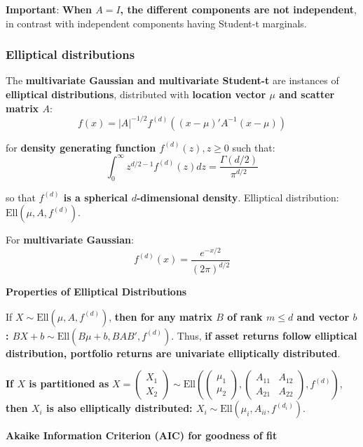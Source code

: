\documentclass[12pt,a4paper]{article}
\begin{document}
\textbf{Important}: \textbf{When $A = I$, the different components are not independent}, in contrast with independent components having Student-t marginals.

\subsubsection{Elliptical distributions}

The \textbf{multivariate Gaussian and multivariate Student-t} are instances of \textbf{elliptical distributions}, distributed with \textbf{location vector $\mu$ and scatter matrix $A$}:
\[
f(x) = |A|^{-1/2} f^{(d)}\left((x - \mu)' A^{-1} (x - \mu)\right)
\]

for \textbf{density generating function $f^{(d)}(z), z \geq 0$} such that:
\[
\int_0^{\infty} z^{d/2-1} f^{(d)}(z) dz = \frac{\Gamma(d/2)}{\pi^{d/2}}
\]

so that \textbf{$f^{(d)}$ is a spherical $d$-dimensional density}. Elliptical distribution: $\text{Ell}(\mu, A, f^{(d)})$.

For \textbf{multivariate Gaussian}:
\[
f^{(d)}(x) = \frac{e^{-x/2}}{(2\pi)^{d/2}}
\]

\vspace{0.5em}

\textbf{Properties of Elliptical Distributions}

If $X \sim \text{Ell}(\mu, A, f^{(d)})$, \textbf{then for any matrix $B$ of rank $m \leq d$ and vector $b$: $BX + b \sim \text{Ell}(B\mu + b, BAB', f^{(d)})$}. Thus, \textbf{if asset returns follow elliptical distribution, portfolio returns are univariate elliptically distributed}.

\textbf{If $X$ is partitioned as} $X = \begin{pmatrix} X_1 \\ X_2 \end{pmatrix} \sim \text{Ell}\left(\begin{pmatrix} \mu_1 \\ \mu_2 \end{pmatrix}, \begin{pmatrix} A_{11} & A_{12} \\ A_{21} & A_{22} \end{pmatrix}, f^{(d)}\right)$, \textbf{then $X_i$ is also elliptically distributed: $X_i \sim \text{Ell}(\mu_i, A_{ii}, f^{(d_i)})$}.

\vspace{0.5em}

\textbf{Akaike Information Criterion (AIC) for goodness of fit}
\end{document}

